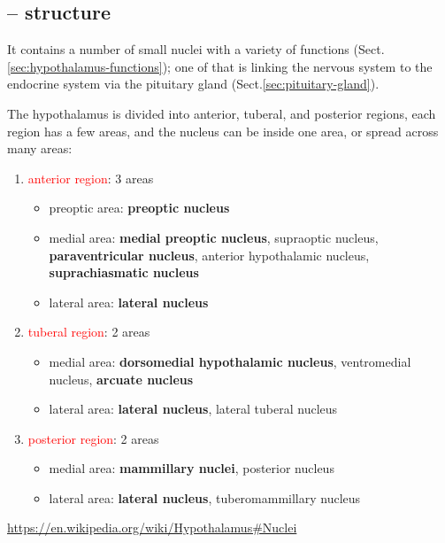 \subsection{-- structure}

It contains a number of small nuclei with a variety of functions
(Sect.\ref{sec:hypothalamus-functions}); one of that is linking the nervous
system to the endocrine system via the pituitary gland
(Sect.\ref{sec:pituitary-gland}).

The hypothalamus is divided into anterior, tuberal, and
posterior regions, each region has a few areas, and the nucleus can be inside
one area, or spread across many areas:
\begin{enumerate}
  
  \item \textcolor{red}{anterior region}: 3 areas
  \begin{itemize}
    \item preoptic area: {\bf preoptic nucleus}
    \item medial area: {\bf medial preoptic nucleus}, supraoptic nucleus, {\bf
    paraventricular nucleus}, anterior hypothalamic nucleus, {\bf
    suprachiasmatic nucleus}
    \item lateral area: {\bf lateral nucleus}
  \end{itemize}
  
  \item \textcolor{red}{tuberal region}: 2 areas
  \begin{itemize}
    \item medial area: {\bf dorsomedial hypothalamic nucleus}, ventromedial
    nucleus, {\bf arcuate nucleus}
    
    \item lateral area: {\bf lateral nucleus}, lateral tuberal nucleus
  \end{itemize}
  
  \item \textcolor{red}{posterior region}: 2 areas
  \begin{itemize}
    \item medial area: {\bf mammillary nuclei}, posterior nucleus
    
    \item lateral area: {\bf lateral nucleus}, tuberomammillary nucleus
  \end{itemize}
  \end{enumerate}
\url{https://en.wikipedia.org/wiki/Hypothalamus#Nuclei}

